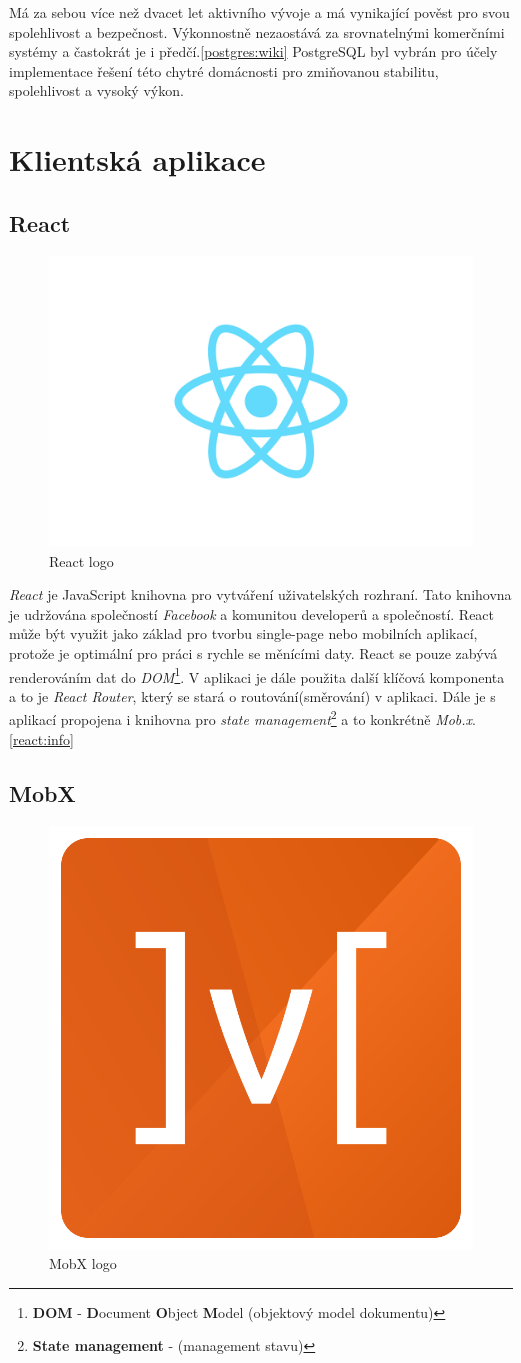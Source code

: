 Má za sebou více než dvacet let aktivního vývoje a má vynikající pověst pro svou spolehlivost a bezpečnost.
Výkonnostně nezaostává za srovnatelnými komerčními systémy a častokrát je i předčí.\ref{postgres:wiki}
PostgreSQL byl vybrán pro účely implementace řešení této chytré domácnosti pro zmiňovanou stabilitu, spolehlivost a vysoký výkon.

\newpage
\section{Klientská aplikace}
\label{pouzite:frontend}

\subsection*{React}
\label{frontend:react}

\begin{figure}[hbt]
  \centering
  \includegraphics[width=.3 \linewidth]{obrazky-figures/react.png}
  \caption{React logo}
\end{figure}

\emph{React} je JavaScript knihovna pro vytváření uživatelských rozhraní.
Tato knihovna je udržována společností \emph{Facebook} a komunitou developerů a společností.
React může být využit jako základ pro tvorbu single-page nebo mobilních aplikací, protože je optimální pro práci s rychle se měnícími daty.
React se pouze zabývá renderováním dat do \emph{DOM}\footnote{\textbf{DOM} - \textbf{D}ocument \textbf{O}bject \textbf{M}odel (objektový model dokumentu)}.
V aplikaci je dále použita další klíčová komponenta a to je \emph{React Router}, který se stará o routování(směrování) v aplikaci.
Dále je s aplikací propojena i knihovna pro \emph{state management}\footnote{\textbf{State management} - (management stavu)} a to konkrétně \emph{Mob.x}.\ref{react:info}

\subsection*{MobX}
\label{frontend:mobx}
\begin{figure}[hbt]
  \centering
  \includegraphics[width=.1 \linewidth]{obrazky-figures/mobx.png}
  \caption{MobX logo}
\end{figure}

